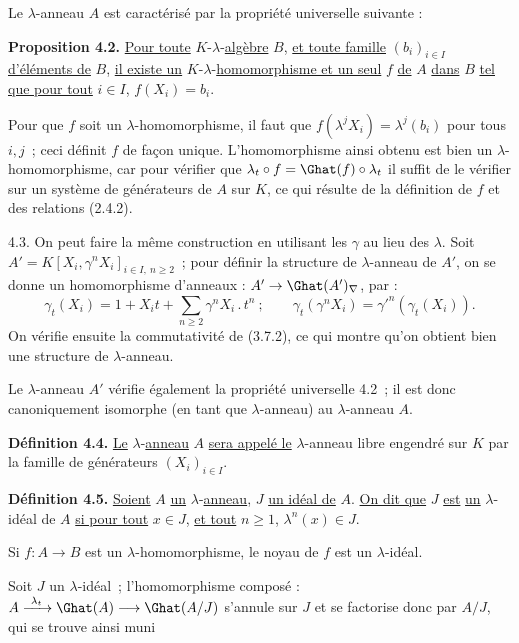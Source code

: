 
Le \(\lambda\)-anneau \(A\) est caractérisé par la propriété universelle suivante :

\textbf{Proposition 4.2.} \uline{Pour toute} \(K\)-\(\lambda\)-\uline{algèbre} \(B\), \uline{et toute famille} \((b_i)_{i\in I}\) \uline{d'éléments de} \(B\), \uline{il existe un} \(K\)-\(\lambda\)-\uline{homomorphisme et un seul} \(f\) \uline{de} \(A\) \uline{dans} \(B\) \uline{tel que pour tout} \(i\in I\), \(f(X_i)=b_i\).

Pour que \(f\) soit un \(\lambda\)-homomorphisme, il faut que \(f(\lambda^j X_i)=\lambda^j(b_i)\) pour tous \(i,j\)~; ceci définit \(f\) de façon unique. L'homomorphisme ainsi obtenu est bien un \(\lambda\)-homomorphisme, car pour vérifier que \(\lambda_t\circ f=\Ghat(f)\circ\lambda_t\) il suffit de le vérifier sur un système de générateurs de \(A\) sur \(K\), ce qui résulte de la définition de \(f\) et des relations (2.4.2).

4.3. On peut faire la même construction en utilisant les \(\gamma\) au lieu des \(\lambda\). Soit \(A'=K[X_i,\gamma^n X_i]_{i\in I,\ n\ge2}\)~; pour définir la structure de \(\lambda\)-anneau de \(A'\), on se donne un homomorphisme d'anneaux : \(A'\to\Ghat(A')_\nabla\), par :
\begin{equation}\tag{4.3.1}
  \gamma_t(X_i)=1+X_it+\sum_{n\ge2}\gamma^n X_i\mathbin{.}t^n~;
  \qquad
  \gamma_t(\gamma^n X_i)=\gamma'^n(\gamma_t(X_i)).
\end{equation}
On vérifie ensuite la commutativité de (3.7.2), ce qui montre qu'on obtient bien une structure de \(\lambda\)-anneau.

Le \(\lambda\)-anneau \(A'\) vérifie également la propriété universelle 4.2~; il est donc canoniquement isomorphe (en tant que \(\lambda\)-anneau) au \(\lambda\)-anneau \(A\).

\textbf{Définition 4.4.} \uline{Le} \(\lambda\)-\uline{anneau} \(A\) \uline{sera appelé le} \(\lambda\)-anneau libre engendré sur \(K\) par la famille de générateurs \((X_i)_{i\in I}\).

\textbf{Définition 4.5.} \uline{Soient} \(A\) \uline{un} \(\lambda\)-\uline{anneau}, \(J\) \uline{un idéal de} \(A\). \uline{On dit que} \(J\) \uline{est} \uline{un} \(\lambda\)-idéal de \(A\) \uline{si pour tout} \(x\in J\), \uline{et tout} \(n\ge1\), \(\lambda^n(x)\in J\).

Si \(f:A\to B\) est un \(\lambda\)-homomorphisme, le noyau de \(f\) est un \(\lambda\)-idéal.

Soit \(J\) un \(\lambda\)-idéal~; l'homomorphisme composé : \(A\xrightarrow{\ \lambda_t\ }\Ghat(A)\longrightarrow\Ghat(A/J)\) s'annule sur \(J\) et se factorise donc par \(A/J\), qui se trouve ainsi muni 
